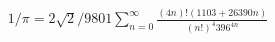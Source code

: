 \documentclass[preview]{standalone}
\begin{document}
\begin{align*}
1 / \pi = 2\sqrt{2} / 9801 \sum_{n=0}^{\infty} \frac{(4n)!(1103+26390n)}{(n!)^4 396^{4n}}
\end{align*}
\end{document}
